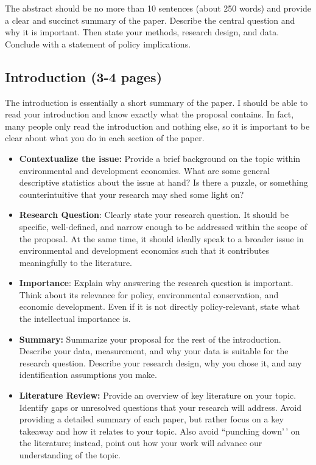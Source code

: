 \documentclass[
]{article}
\begin{document}
The abstract should be no more than 10 sentences (about 250 words) and provide a clear and succinct summary of the paper. Describe the central question and why it is important. Then state your methods, research design, and data. Conclude with a statement of policy implications.

\hypertarget{introduction-3-4-pages}{%
\subsection{Introduction (3-4 pages)}\label{introduction-3-4-pages}}

The introduction is essentially a short summary of the paper. I should be able to read your introduction and know exactly what the proposal contains. In fact, many people only read the introduction and nothing else, so it is important to be clear about what you do in each section of the paper.

\begin{itemize}
\item
  \textbf{Contextualize the issue:} Provide a brief background on the topic within environmental and development economics. What are some general descriptive statistics about the issue at hand? Is there a puzzle, or something counterintuitive that your research may shed some light on?
\item
  \textbf{Research Question}: Clearly state your research question. It should be specific, well-defined, and narrow enough to be addressed within the scope of the proposal. At the same time, it should ideally speak to a broader issue in environmental and development economics such that it contributes meaningfully to the literature.
\item
  \textbf{Importance}: Explain why answering the research question is important. Think about its relevance for policy, environmental conservation, and economic development. Even if it is not directly policy-relevant, state what the intellectual importance is.
\item
  \textbf{Summary:} Summarize your proposal for the rest of the introduction. Describe your data, measurement, and why your data is suitable for the research question. Describe your research design, why you chose it, and any identification assumptions you make.
\item
  \textbf{Literature Review:} Provide an overview of key literature on your topic. Identify gaps or unresolved questions that your research will address. Avoid providing a detailed summary of each paper, but rather focus on a key takeaway and how it relates to your topic. Also avoid ``punching down'\,' on the literature; instead, point out how your work will advance our understanding of the topic.
\end{itemize}
\end{document}
